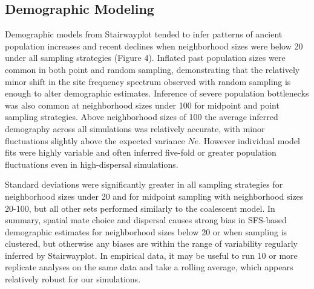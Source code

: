 \documentclass[9pt,twocolumn,twoside,lineno]{gsajnl}
\begin{document}
\subsection{Demographic Modeling}
Demographic models from Stairwayplot tended to infer patterns of ancient population increases and recent declines when neighborhood sizes were below 20 under all sampling strategies (Figure 4). Inflated past population sizes were common in both point and random sampling, demonstrating that the relatively minor shift in the site frequency spectrum observed with random sampling is enough to alter demographic estimates. Inference of severe population bottlenecks was also common at neighborhood sizes under 100 for midpoint and point sampling strategies. Above neighborhood sizes of 100 the average inferred demography across all simulations was relatively accurate, with minor fluctuations slightly above the expected variance $Ne$. However individual model fits were highly variable and often inferred five-fold or greater population fluctuations even in high-dispersal simulations.  

Standard deviations were significantly greater in all sampling strategies for neighborhood sizes under 20 and for midpoint sampling with neighborhood sizes 20-100, but all other sets performed similarly to the coalescent model. In summary, spatial mate choice and dispersal causes strong bias in SFS-based demographic estimates for neighborhood sizes below 20 or when sampling is clustered, but otherwise any biases are within the range of variability regularly inferred by Stairwayplot. In empirical data, it may be useful to run 10 or more replicate analyses on the same data and take a rolling average, which appears relatively robust for our simulations.   
\end{document}
